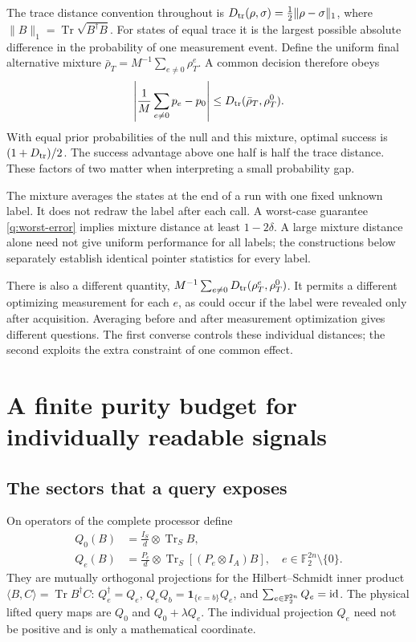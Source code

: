 \documentclass[11pt,a4paper]{article}
\numberwithin{equation}{section}
\theoremstyle{definition}
\theoremstyle{remark}
\DeclareMathOperator{\Tr}{Tr}
\begin{document}
The trace distance convention throughout is
$D_{\rm tr}(\rho,\sigma)=\tfrac12\|\rho-\sigma\|_1$, where
$\|B\|_1=\Tr\sqrt{B^\dagger B}$. For states of equal trace it is the largest
possible absolute difference in the probability of one measurement event.
Define the uniform final alternative mixture
$\bar\rho_T=M^{-1}\sum_{e\ne0}\rho_T^e$. A common decision therefore obeys
\[
 \left|\frac1M\sum_{e\ne0} p_e-p_0\right|
 \leq D_{\rm tr}(\bar\rho_T,\rho_T^0).
 \]
With equal prior probabilities of the null and this mixture, optimal success is
$(1+D_{\rm tr})/2$. The success advantage above one half is half the trace
distance. These factors of two matter when interpreting a small probability gap.

The mixture averages the states at the end of a run with one fixed unknown
label. It does not redraw the label after each call. A worst-case guarantee
\eqref{q:worst-error} implies mixture distance at least $1-2\delta$.
A large mixture distance alone need not give uniform performance for all
labels; the constructions below separately establish identical pointer
statistics for every label.

There is also a different quantity,
$M^{-1}\sum_{e\ne0}D_{\rm tr}(\rho_T^e,\rho_T^0)$. It permits a different optimizing
measurement for each $e$, as could occur if the label were revealed only after
acquisition. Averaging before and after measurement optimization gives
different questions. The first converse controls these individual distances;
the second exploits the extra constraint of one common effect.

\section{A finite purity budget for individually readable signals}

\subsection{The sectors that a query exposes}

On operators of the complete processor define
\begin{align}
 Q_0(B)&=\frac{I_S}{d}\otimes\Tr_S B,\nonumber\\
 Q_e(B)&=\frac{P_e}{d}\otimes
            \Tr_S[(P_e\otimes I_A)B],\quad e\in\mathbb F_2^{2n}\setminus\{0\} .
 \label{q:sectors}
\end{align}
They are mutually orthogonal projections for the Hilbert--Schmidt inner
product $\langle B,C\rangle=\Tr B^\dagger C$:
$Q_e^\dagger=Q_e$, $Q_eQ_b=\mathbf1_{\{e=b\}}Q_e$, and
$\sum_{e\in\mathbb F_2^{2n}} Q_e={\rm id}$. The physical lifted query maps are
$Q_0$ and $Q_0+\lambda Q_e$. The individual projection $Q_e$ need not be
positive and is only a mathematical coordinate.
\end{document}
